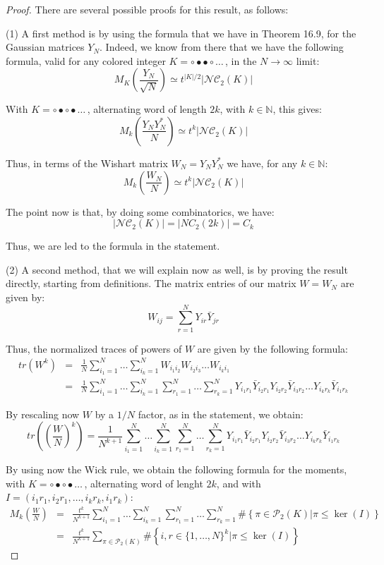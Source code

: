 \documentclass[12pt]{amsbook}
\begin{document}
\begin{proof}
There are several possible proofs for this result, as follows:

\medskip

(1) A first method is by using the formula that we have in Theorem 16.9, for the Gaussian matrices $Y_N$. Indeed, we know from there that we have the following formula, valid for any colored integer $K=\circ\bullet\bullet\circ\ldots\,$, in the $N\to\infty$ limit:
$$M_K\left(\frac{Y_N}{\sqrt{N}}\right)\simeq t^{|K|/2}|\mathcal{NC}_2(K)|$$

With $K=\circ\bullet\circ\bullet\ldots\,$, alternating word of length $2k$, with $k\in\mathbb N$, this gives:
$$M_k\left(\frac{Y_NY_N^*}{N}\right)\simeq t^k|\mathcal{NC}_2(K)|$$

Thus, in terms of the Wishart matrix $W_N=Y_NY_N^*$ we have, for any $k\in\mathbb N$:
$$M_k\left(\frac{W_N}{N}\right)\simeq t^k|\mathcal{NC}_2(K)|$$

The point now is that, by doing some combinatorics, we have:
$$|\mathcal{NC}_2(K)|=|NC_2(2k)|=C_k$$

Thus, we are led to the formula in the statement.

\medskip

(2) A second method, that we will explain now as well, is by proving the result directly, starting from definitions. The matrix entries of our matrix $W=W_N$ are given by:
$$W_{ij}=\sum_{r=1}^NY_{ir}\bar{Y}_{jr}$$

Thus, the normalized traces of powers of $W$ are given by the following formula:
\begin{eqnarray*}
tr(W^k)
&=&\frac{1}{N}\sum_{i_1=1}^N\ldots\sum_{i_k=1}^NW_{i_1i_2}W_{i_2i_3}\ldots W_{i_ki_1}\\
&=&\frac{1}{N}\sum_{i_1=1}^N\ldots\sum_{i_k=1}^N\sum_{r_1=1}^N\ldots\sum_{r_k=1}^NY_{i_1r_1}\bar{Y}_{i_2r_1}Y_{i_2r_2}\bar{Y}_{i_3r_2}\ldots Y_{i_kr_k}\bar{Y}_{i_1r_k}
\end{eqnarray*}

By rescaling now $W$ by a $1/N$ factor, as in the statement, we obtain:
$$tr\left(\left(\frac{W}{N}\right)^k\right)=\frac{1}{N^{k+1}}\sum_{i_1=1}^N\ldots\sum_{i_k=1}^N\sum_{r_1=1}^N\ldots\sum_{r_k=1}^NY_{i_1r_1}\bar{Y}_{i_2r_1}Y_{i_2r_2}\bar{Y}_{i_3r_2}\ldots Y_{i_kr_k}\bar{Y}_{i_1r_k}$$

By using now the Wick rule, we obtain the following formula for the moments, with $K=\circ\bullet\circ\bullet\ldots\,$, alternating word of lenght $2k$, and with $I=(i_1r_1,i_2r_1,\ldots,i_kr_k,i_1r_k)$:
\begin{eqnarray*}
M_k\left(\frac{W}{N}\right)
&=&\frac{t^k}{N^{k+1}}\sum_{i_1=1}^N\ldots\sum_{i_k=1}^N\sum_{r_1=1}^N\ldots\sum_{r_k=1}^N\#\left\{\pi\in\mathcal P_2(K)\Big|\pi\leq\ker(I)\right\}\\
&=&\frac{t^k}{N^{k+1}}\sum_{\pi\in\mathcal P_2(K)}\#\left\{i,r\in\{1,\ldots,N\}^k\Big|\pi\leq\ker(I)\right\}
\end{eqnarray*}


\end{proof}
\end{document}
